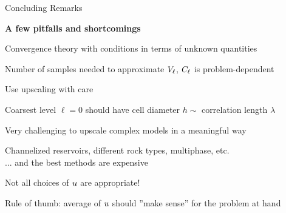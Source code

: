 \def\name{Concluding Remarks}

\begin{frame}{\name{}}

    \textbf{A few pitfalls and shortcomings}\vskip2mm
    \begin{squarelist}
        \item<2-> Convergence theory with conditions in terms of unknown quantities
        \begin{circlelist}
            \item Number of samples needed to approximate $V_\ell$, $C_\ell$ is problem-dependent
        \end{circlelist}
        \item<3-> Use upscaling with care
        \begin{circlelist}
            \item Coarsest level $\ell = 0$ should have cell diameter $h \sim$ correlation length $\lambda$
        \end{circlelist}
        \item<4-> Very challenging to upscale complex models in a meaningful way
        \begin{circlelist}
            \item Channelized reservoirs, different rock types, multiphase, etc. \\
            ... and the best methods are expensive
        \end{circlelist}
        \item<5-> Not all choices of $u$ are appropriate!
        \begin{circlelist}
            \item Rule of thumb: average of $u$ should ''make sense'' for the problem at hand
        \end{circlelist}
    \end{squarelist}
    
\end{frame}

